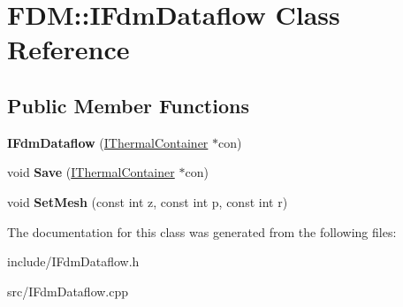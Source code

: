 \hypertarget{class_f_d_m_1_1_i_fdm_dataflow}{}\section{F\+D\+M\+:\+:I\+Fdm\+Dataflow Class Reference}
\label{class_f_d_m_1_1_i_fdm_dataflow}
\subsection*{Public Member Functions}
\begin{DoxyCompactItemize}
\item 
\hypertarget{class_f_d_m_1_1_i_fdm_dataflow_a8868a3f59b50ed03f2479748a3ec3b37}{}{\bfseries I\+Fdm\+Dataflow} (\hyperlink{class_i_thermal_container}{I\+Thermal\+Container} $\ast$con)\label{class_f_d_m_1_1_i_fdm_dataflow_a8868a3f59b50ed03f2479748a3ec3b37}

\item 
\hypertarget{class_f_d_m_1_1_i_fdm_dataflow_a6407abe50ce6b644c06b39f845228b71}{}void {\bfseries Save} (\hyperlink{class_i_thermal_container}{I\+Thermal\+Container} $\ast$con)\label{class_f_d_m_1_1_i_fdm_dataflow_a6407abe50ce6b644c06b39f845228b71}

\item 
\hypertarget{class_f_d_m_1_1_i_fdm_dataflow_a463f8bf347de4a23598d89deccdba275}{}void {\bfseries Set\+Mesh} (const int z, const int p, const int r)\label{class_f_d_m_1_1_i_fdm_dataflow_a463f8bf347de4a23598d89deccdba275}

\end{DoxyCompactItemize}


The documentation for this class was generated from the following files\+:\begin{DoxyCompactItemize}
\item 
include/I\+Fdm\+Dataflow.\+h\item 
src/I\+Fdm\+Dataflow.\+cpp\end{DoxyCompactItemize}

